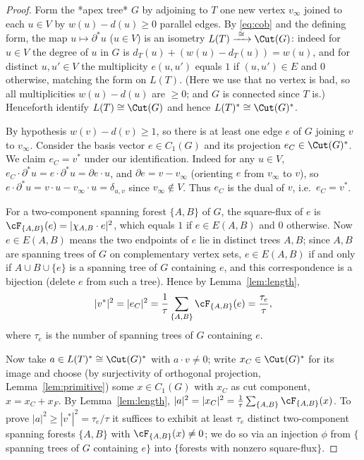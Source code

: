 \begin{proof}
Form the *apex tree* $G$ by adjoining to $T$ one new vertex $v_\infty$ joined to
each $u\in V$ by $w(u)-d(u)\geq0$ parallel edges. By \eqref{eq:cob} and the
defining form, the map $u\mapsto\partial^{*}u$ ($u\in V$) is an isometry
$L(T)\xrightarrow{\ \cong\ }\Cut(G)$: indeed for $u\in V$ the degree of $u$ in
$G$ is $d_T(u)+(w(u)-d_T(u))=w(u)$, and for distinct $u,u'\in V$ the multiplicity
$e(u,u')$ equals $1$ if $(u,u')\in E$ and $0$ otherwise, matching the form on
$L(T)$. (Here we use that no vertex is bad, so all multiplicities $w(u)-d(u)$ are
$\geq0$; and $G$ is connected since $T$ is.) Henceforth identify
$L(T)\cong\Cut(G)$ and hence $L(T)^{*}\cong\Cut(G)^{*}$.

By hypothesis $w(v)-d(v)\geq1$, so there is at least one edge $e$ of $G$ joining
$v$ to $v_\infty$. Consider the basis vector $e\in C_1(G)$ and its projection
$e_C\in\Cut(G)^{*}$. We claim $e_C=v^{*}$ under our identification. Indeed for
any $u\in V$, $e_C\cdot\partial^{*}u=e\cdot\partial^{*}u=\partial e\cdot u$, and
$\partial e=v-v_\infty$ (orienting $e$ from $v_\infty$ to $v$), so
$e\cdot\partial^{*}u=v\cdot u-v_\infty\cdot u=\delta_{u,v}$ since $v_\infty\notin
V$. Thus $e_C$ is the dual of $v$, i.e.\ $e_C=v^{*}$.

For a two-component spanning forest $\{A,B\}$ of $G$, the square-flux of $e$ is
$\cF_{\{A,B\}}(e)=|\chi_{A,B}\cdot e|^2$, which equals $1$ if $e\in E(A,B)$ and
$0$ otherwise. Now $e\in E(A,B)$ means the two endpoints of $e$ lie in distinct
trees $A,B$; since $A,B$ are spanning trees of $G$ on complementary vertex sets,
$e\in E(A,B)$ if and only if $A\cup B\cup\{e\}$ is a spanning tree of $G$
containing $e$, and this correspondence is a bijection (delete $e$ from such a
tree). Hence by Lemma~\ref{lem:length},
\begin{equation}\label{eq:vstar}
|v^{*}|^2=|e_C|^2=\frac1\tau\sum_{\{A,B\}}\cF_{\{A,B\}}(e)=\frac{\tau_e}{\tau},
\end{equation}
where $\tau_e$ is the number of spanning trees of $G$ containing $e$.

Now take $a\in L(T)^{*}\cong\Cut(G)^{*}$ with $a\cdot v\neq0$; write $x_C\in
\Cut(G)^{*}$ for its image and choose (by surjectivity of orthogonal
projection, Lemma~\ref{lem:primitive}) some $x\in C_1(G)$ with $x_C$ as cut
component, $x=x_C+x_F$. By Lemma~\ref{lem:length},
$|a|^2=|x_C|^2=\frac1\tau\sum_{\{A,B\}}\cF_{\{A,B\}}(x)$. To prove
$|a|^2\geq|v^{*}|^2=\tau_e/\tau$ it suffices to exhibit at least $\tau_e$
distinct two-component spanning forests $\{A,B\}$ with $\cF_{\{A,B\}}(x)\neq0$;
we do so via an injection $\phi$ from $\{$spanning trees of $G$ containing
$e\}$ into $\{$forests with nonzero square-flux$\}$.


\end{proof}
